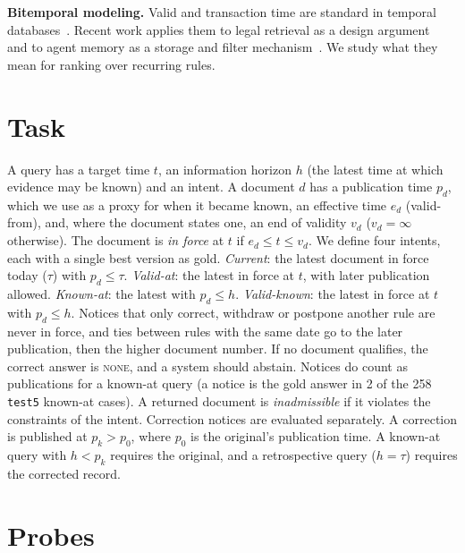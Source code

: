 \documentclass[11pt]{article}
\begin{document}
\textbf{Bitemporal modeling.} Valid and transaction time are standard in temporal databases~\cite{jensen1996}. Recent work applies them to legal retrieval as a design argument~\cite{demartim2026} and to agent memory as a storage and filter mechanism~\cite{niksarli2026}. We study what they mean for ranking over recurring rules.

\section{Task}\label{sec:form}
A query has a target time $t$, an information horizon $h$ (the latest time at which evidence may be known) and an intent. A document $d$ has a publication time $p_d$, which we use as a proxy for when it became known, an effective time $e_d$ (valid-from), and, where the document states one, an end of validity $v_d$ ($v_d=\infty$ otherwise). The document is \emph{in force} at $t$ if $e_d\le t\le v_d$. We define four intents, each with a single best version as gold. \emph{Current}: the latest document in force today ($\tau$) with $p_d\le\tau$. \emph{Valid-at}: the latest in force at $t$, with later publication allowed. \emph{Known-at}: the latest with $p_d\le h$. \emph{Valid-known}: the latest in force at $t$ with $p_d\le h$. Notices that only correct, withdraw or postpone another rule are never in force, and ties between rules with the same date go to the later publication, then the higher document number. If no document qualifies, the correct answer is \textsc{none}, and a system should abstain. Notices do count as publications for a known-at query (a notice is the gold answer in 2 of the 258 \texttt{test5} known-at cases). A returned document is \emph{inadmissible} if it violates the constraints of the intent. Correction notices are evaluated separately. A correction is published at $p_k>p_0$, where $p_0$ is the original's publication time. A known-at query with $h<p_k$ requires the original, and a retrospective query ($h=\tau$) requires the corrected record.

\section{Probes}\label{sec:data}
\end{document}
